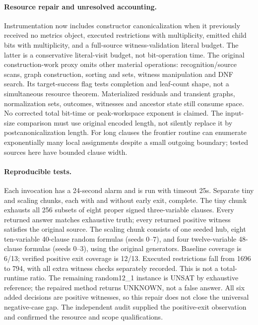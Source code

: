 \documentclass{article}
\begin{document}
\paragraph{Resource repair and unresolved accounting.}
Instrumentation now includes constructor canonicalization when it previously
received no metrics object, executed restrictions with multiplicity,
emitted child bits with multiplicity, and a full-source witness-validation
literal budget. The latter is a conservative literal-visit budget,
not bit-operation time.
The original construction-work proxy omits other material operations:
recognition/source scans, graph construction, sorting and sets,
witness manipulation and DNF search.
Its target-success flag tests completion and leaf-count shape, not a
simultaneous resource theorem. Materialized residuals and transient graphs,
normalization sets, outcomes, witnesses and ancestor state still consume space.
No corrected total bit-time or peak-workspace exponent is claimed.
The input-size comparison must use original encoded length, not silently
replace it by postcanonicalization length.
For long clauses the frontier routine can enumerate exponentially many
local assignments despite a small outgoing boundary; tested sources here
have bounded clause width.

\paragraph{Reproducible tests.}
Each invocation has a 24-second alarm and is run with timeout 25s.
Separate tiny and scaling chunks, each with and without early exit, complete.
The tiny chunk exhausts all 256 subsets of eight proper signed
three-variable clauses. Every returned answer matches exhaustive truth;
every returned positive witness satisfies the original source.
The scaling chunk consists of one seeded hub, eight ten-variable
40-clause random formulas (seeds 0--7), and four twelve-variable 48-clause
formulas (seeds 0--3), using the original generators.
Baseline coverage is 6/13; verified positive exit coverage is 12/13.
Executed restrictions fall from 1696 to 794, with all extra witness checks
separately recorded. This is not a total-runtime ratio.
The remaining random12\_1 instance is UNSAT by exhaustive reference;
the repaired method returns UNKNOWN, not a false answer.
All six added decisions are positive witnesses, so this repair does not
close the universal negative-case gap.
The independent audit supplied the positive-exit observation and confirmed
the resource and scope qualifications.
\end{document}
